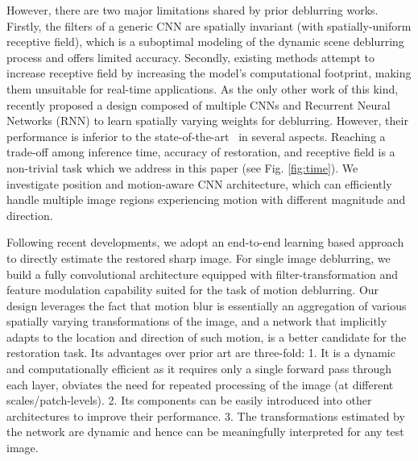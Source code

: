 \documentclass[letterpaper]{article} \usepackage{aaai20}  \usepackage{times}  \usepackage{helvet} \usepackage{courier}  \usepackage[hyphens]{url}  \usepackage{graphicx} \urlstyle{rm} \def\UrlFont{\rm}  \usepackage{graphicx}  \frenchspacing  \setlength{\pdfpagewidth}{8.5in}  \setlength{\pdfpageheight}{11in}
\begin{document}
However, there are two major limitations shared by prior deblurring works. Firstly, the filters of a generic CNN are spatially invariant (with spatially-uniform receptive field), which is a suboptimal modeling of the dynamic scene deblurring process and offers limited accuracy. Secondly, existing methods attempt to increase receptive field by increasing the model's computational footprint, making them unsuitable for real-time applications. As the only other work of this kind, \cite{zhang2018dynamic} recently proposed a design composed of multiple CNNs and Recurrent Neural Networks (RNN) to learn spatially varying weights for deblurring. However, their performance is inferior to the state-of-the-art~\cite{zhang2019deep} in several aspects. Reaching a trade-off among inference time, accuracy of restoration, and receptive field is a non-trivial task which we address in this paper (see Fig. \ref{fig:time}). We investigate position and motion-aware CNN architecture, which can efficiently handle multiple image regions experiencing motion with different magnitude and direction. 



Following recent developments, we adopt an end-to-end learning based approach to directly estimate the restored sharp image. For single image deblurring, we build a fully convolutional architecture equipped with filter-transformation and feature modulation capability suited for the task of motion deblurring. Our design leverages the fact that motion blur is essentially an aggregation of various spatially varying transformations of the image, and a network that implicitly adapts to the location and direction of such motion, is a better candidate for the restoration task. Its advantages over prior art are three-fold: 1. It is a dynamic and computationally efficient as it requires only a single forward pass through each layer, obviates the need for repeated processing of the image (at different scales/patch-levels). 2. Its components can be easily introduced into other architectures to improve their performance. 3. The transformations estimated by the network are dynamic and hence can be meaningfully interpreted for any test image. 
\end{document}
